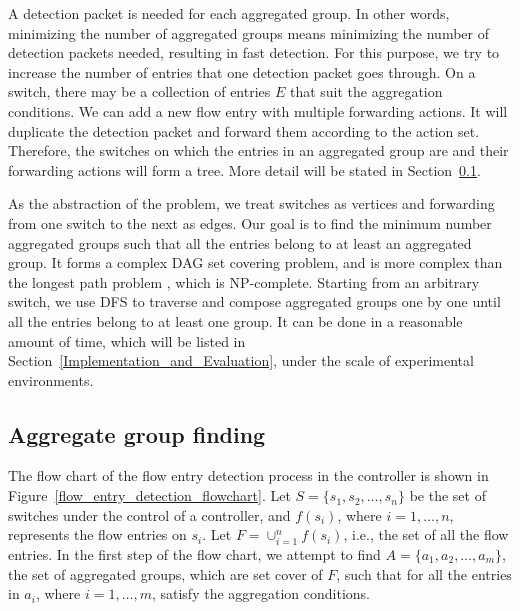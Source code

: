 A detection packet is needed for each aggregated group. In other words, minimizing the number of aggregated groups means minimizing the number of detection packets needed, resulting in fast detection. For this purpose, we try to increase the number of entries that one detection packet goes through. On a switch, there may be a collection of entries $E$ that suit the aggregation conditions. We can add a new flow entry with multiple forwarding actions. It will duplicate the detection packet and forward them according to the action set. Therefore, the switches on which the entries in an aggregated group are and their forwarding actions will form a tree. More detail will be stated in Section~\ref{Aggregated_group_finding}.

As the abstraction of the problem, we treat switches as vertices and forwarding from one switch to the next as edges. Our goal is to find the minimum number aggregated groups such that all the entries belong to at least an aggregated group. It forms a complex DAG set covering problem, \sout{} and is more complex than the longest path problem \cite{DMR97,RU04}, which is NP-complete. Starting from an arbitrary switch, we use DFS to traverse and compose aggregated groups one by one until all the entries belong to at least one group. It can be done in a reasonable amount of time, which will be listed in Section~\ref{Implementation_and_Evaluation}, under the scale of experimental environments.


\subsection{Aggregate group finding}
\label{Aggregated_group_finding}

The flow chart of the flow entry detection process in the controller is shown in Figure~\ref{flow_entry_detection_flowchart}. Let $S=\{s_1,s_2,\ldots,s_n\}$ be the set of switches under the control of a controller, and $f(s_i)$, where $i=1,\ldots,n$, represents the flow entries on $s_i$. Let $F=\cup_{i=1}^n f(s_i)$, i.e., the set of all the flow entries. In the first step of the flow chart, we attempt to find $A=\{a_1, a_2, \ldots, a_m\}$, the set of aggregated groups, which are set cover of $F$, such that for all the entries in $a_i$, where $i=1,\ldots,m$, satisfy the aggregation conditions.

